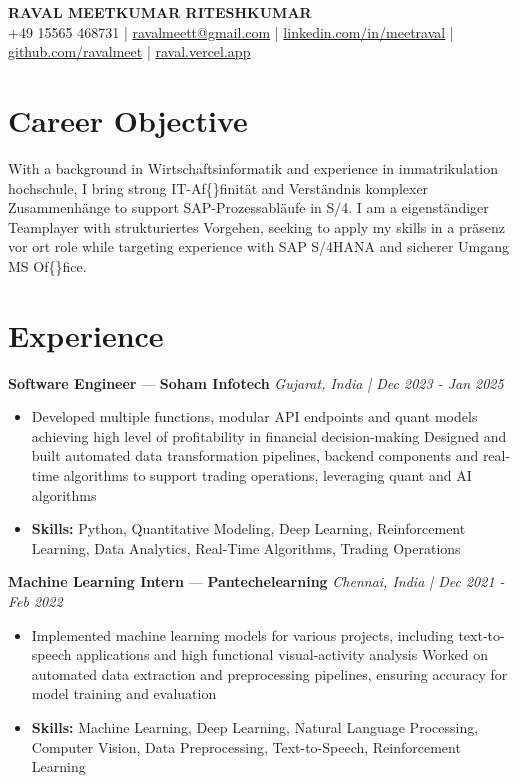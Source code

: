 \documentclass[a4paper,10pt]{article}
\begin{document}
\begin{center}
  {\Large\bfseries RAVAL MEETKUMAR RITESHKUMAR}\\[2pt]
  {\small +49 15565 468731 \;|\; \href{mailto:ravalmeett@gmail.com}{ravalmeett@gmail.com} \;|\; \href{https://www.linkedin.com/in/meetraval/}{linkedin.com/in/meetraval} \;|\; \href{https://github.com/ravalmeet}{github.com/ravalmeet} \;|\; \href{https://raval.vercel.app/}{raval.vercel.app}}
\end{center}
\vspace{-3pt}

\section*{Career Objective}
With a background in Wirtschaftsinformatik and experience in immatrikulation hochschule, I bring strong IT-Af\{\}finität and Verständnis komplexer Zusammenhänge to support SAP-Prozessabläufe in S/4. I am a eigenständiger Teamplayer with strukturiertes Vorgehen, seeking to apply my skills in a präsenz vor ort role while targeting experience with SAP S/4HANA and sicherer Umgang MS Of\{\}fice.\par

\section*{Experience}
\textbf{Software Engineer} — \textbf{Soham Infotech} \hfill \textit{Gujarat, India \;|\; Dec 2023 - Jan 2025}\par
\vspace{1pt}
\begin{itemize}
  \item Developed multiple functions, modular API endpoints and quant models achieving high level of profitability in financial decision-making Designed and built automated data transformation pipelines, backend components and real-time algorithms to support trading operations, leveraging quant and AI algorithms
  \item \textbf{Skills:} Python, Quantitative Modeling, Deep Learning, Reinforcement Learning, Data Analytics, Real-Time Algorithms, Trading Operations
\end{itemize}
\vspace{3pt}
\textbf{Machine Learning Intern} — \textbf{Pantechelearning} \hfill \textit{Chennai, India \;|\; Dec 2021 - Feb 2022}\par
\vspace{1pt}
\begin{itemize}
  \item Implemented machine learning models for various projects, including text-to-speech applications and high functional visual-activity analysis Worked on automated data extraction and preprocessing pipelines, ensuring accuracy for model training and evaluation
  \item \textbf{Skills:} Machine Learning, Deep Learning, Natural Language Processing, Computer Vision, Data Preprocessing, Text-to-Speech, Reinforcement Learning
\end{itemize}
\end{document}
